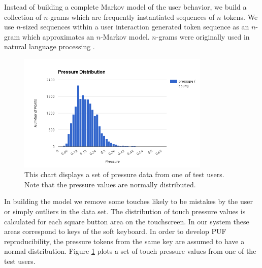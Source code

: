 \documentclass{acm_proc_article-sp}
\begin{document}

Instead of building a complete Markov model of the user behavior,
we build a collection of $n$-grams
which are frequently instantiated sequences of $n$ tokens.
We use $n$-sized sequences 
within a user interaction
generated token sequence as an
$n$-gram which approximates an $n$-Markov model.
$n$-grams were originally
used in natural language processing \cite{Brown:ngram}.

\begin{figure}
\centering
\includegraphics[width=3.6in]{normal_distribution.png}
\caption{This chart displays a set of pressure data from one of test users. Note that the pressure values are normally distributed.}
\label{fig:normal_distribution}
\end{figure}

In building the model we remove some touches likely to be mistakes by the user or simply outliers in the data set.
The distribution of touch pressure values is calculated for each square button area on the touchscreen. 
In our system these areas correspond to keys of the soft keyboard.
In order to develop PUF reproducibility,
the pressure tokens from the same key are 
assumed
to have a normal distribution.
Figure \ref{fig:normal_distribution} plots a set of touch pressure values from one of the test users.

\end{document}
